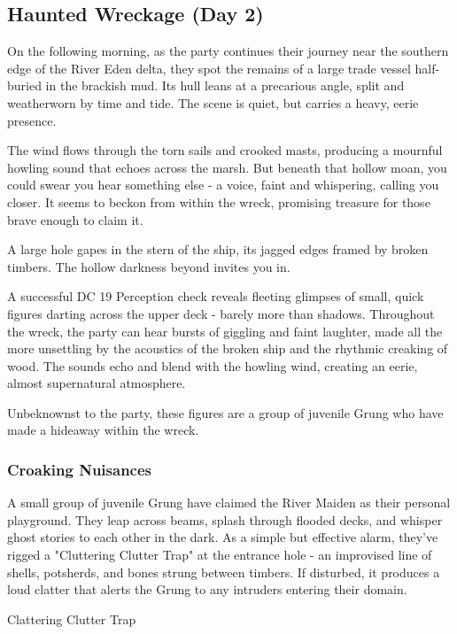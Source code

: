 \subsection*{Haunted Wreckage (Day 2)}
{\entryfont On the following morning, as the party continues their journey near the southern edge of the River Eden delta, they spot the remains of a large trade vessel half-buried in the brackish mud. Its hull leans at a precarious angle, split and weatherworn by time and tide. The scene is quiet, but carries a heavy, eerie presence.}

\begin{DndReadAloud}
	The wind flows through the torn sails and crooked masts, producing a mournful howling sound that echoes across the marsh. But beneath that hollow moan, you could swear you hear something else - a voice, faint and whispering, calling you closer. It seems to beckon from within the wreck, promising treasure for those brave enough to claim it.

	A large hole gapes in the stern of the ship, its jagged edges framed by broken timbers. The hollow darkness beyond invites you in.
\end{DndReadAloud}

{\entryfont\noindent A successful DC 19 Perception check reveals fleeting glimpses of small, quick figures darting across the upper deck - barely more than shadows. Throughout the wreck, the party can hear bursts of giggling and faint laughter, made all the more unsettling by the acoustics of the broken ship and the rhythmic creaking of wood. The sounds echo and blend with the howling wind, creating an eerie, almost supernatural atmosphere.

Unbeknownst to the party, these figures are a group of juvenile Grung who have made a hideaway within the wreck.}

\subsubsection*{Croaking Nuisances}
{\entryfont A small group of juvenile Grung have claimed the River Maiden as their personal playground. They leap across beams, splash through flooded decks, and whisper ghost stories to each other in the dark. As a simple but effective alarm, they've rigged a "Cluttering Clutter Trap" at the entrance hole - an improvised line of shells, potsherds, and bones strung between timbers. If disturbed, it produces a loud clatter that alerts the Grung to any intruders entering their domain.}
\begin{DndTrap}[width=0.5\textwidth - 4pt]{Clattering Clutter Trap}
\end{DndTrap}


